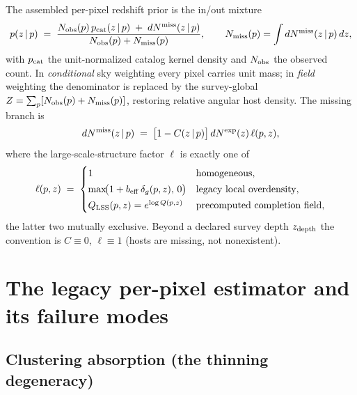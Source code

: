 \documentclass[11pt]{article}
\newcommand{\dNexp}{dN^{\rm exp}}
\newcommand{\dNmiss}{dN^{\rm miss}}
\newcommand{\Qlss}{Q_{\rm LSS}}
\begin{document}
The assembled per-pixel redshift prior is the in/out mixture
\begin{equation}
p(z\,|\,p) \;=\; \frac{N_{\rm obs}(p)\, p_{\rm cat}(z\,|\,p) \;+\; \dNmiss(z\,|\,p)}
{N_{\rm obs}(p) + N_{\rm miss}(p)},
\qquad
N_{\rm miss}(p) = \int \dNmiss(z\,|\,p)\, dz ,
\label{eq:prior}
\end{equation}
with $p_{\rm cat}$ the unit-normalized catalog kernel density and $N_{\rm obs}$ the
observed count. In \emph{conditional} sky weighting every pixel carries unit mass; in
\emph{field} weighting the denominator is replaced by the survey-global
$Z = \sum_p [N_{\rm obs}(p) + N_{\rm miss}(p)]$, restoring relative angular host
density. The missing branch is
\begin{equation}
\dNmiss(z\,|\,p) \;=\; \bigl[1 - C(z\,|\,p)\bigr]\, \dNexp(z)\, \ell(p, z),
\label{eq:dnmiss}
\end{equation}
where the large-scale-structure factor $\ell$ is exactly one of
\begin{equation}
\ell(p,z) \;=\;
\begin{cases}
1 & \text{homogeneous},\\[2pt]
\max\!\bigl(1 + b_{\rm eff}\,\delta_g(p,z),\, 0\bigr) & \text{legacy local overdensity},\\[2pt]
\Qlss(p,z) = e^{\log Q(p,z)} & \text{precomputed completion field},
\end{cases}
\label{eq:lss}
\end{equation}
the latter two mutually exclusive. Beyond a declared survey depth $z_{\rm depth}$ the
convention is $C \equiv 0$, $\ell \equiv 1$ (hosts are missing, not nonexistent).

\section{The legacy per-pixel estimator and its failure modes}
\label{sec:legacy}

\subsection{Clustering absorption (the thinning degeneracy)}
\end{document}
